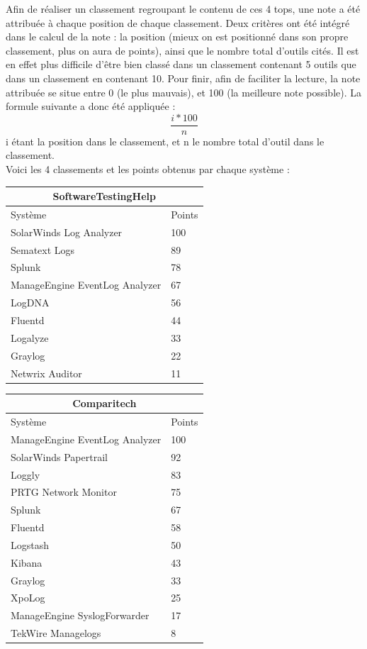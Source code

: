 \documentclass[paper=a4, fontsize=11pt]{scrartcl}
\begin{document}
Afin de réaliser un classement regroupant le contenu de ces 4 tops, une note a été attribuée à chaque position de chaque classement. Deux critères ont été intégré dans le calcul de la note : la position (mieux on est positionné dans son propre classement, plus on aura de points), ainsi que le nombre total d'outils cités. Il est en effet plus difficile d'être bien classé dans un classement contenant 5 outils que dans un classement en contenant 10. Pour finir, afin de faciliter la lecture, la note attribuée se situe entre 0 (le plus mauvais), et 100 (la meilleure note possible). La formule suivante a donc été appliquée :
\[\frac{i * 100}{n}\]
i étant la position dans le classement, et n le nombre total d'outil dans le classement.\\

Voici les 4 classements et les points obtenus par chaque système :\\
    \begin{tabular}{ |p{6cm}|p{1cm}|  }
     \hline
     \multicolumn{2}{|c|}{SoftwareTestingHelp} \\
     \hline
     Système & Points\\
     \hline
     SolarWinds Log Analyzer & 100\\
     Sematext Logs & 89\\
     Splunk & 78\\
     ManageEngine EventLog Analyzer & 67\\
     LogDNA & 56\\
     Fluentd & 44\\
     Logalyze & 33\\
     Graylog & 22\\
     Netwrix Auditor & 11\\
     \hline
    \end{tabular}
\hfill
    \begin{tabular}{ |p{6cm}|p{1cm}|  }
     \hline
     \multicolumn{2}{|c|}{Comparitech} \\
     \hline
     Système & Points\\
     \hline
     ManageEngine EventLog Analyzer & 100\\
     SolarWinds Papertrail & 92\\
     Loggly & 83\\
     PRTG Network Monitor & 75\\
     Splunk & 67\\
     Fluentd & 58\\
     Logstash & 50\\
     Kibana & 43\\
     Graylog & 33\\
     XpoLog & 25\\
     ManageEngine SyslogForwarder & 17\\
     TekWire Managelogs & 8\\
     \hline
    \end{tabular}
\end{document}

